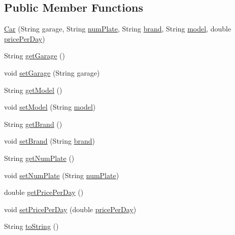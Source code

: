 \subsection*{Public Member Functions}
\begin{DoxyCompactItemize}
\item 
\mbox{\hyperlink{classcarrenting_1_1server_1_1jdo_1_1_car_ab43f746c910fab7cbc39e73aa9911384}{Car}} (String garage, String \mbox{\hyperlink{classcarrenting_1_1server_1_1jdo_1_1_car_a6d3bb3a60ca384974c0beea5a4357ebf}{num\+Plate}}, String \mbox{\hyperlink{classcarrenting_1_1server_1_1jdo_1_1_car_a346b3365c2ed154c6beb8e25e6d589fd}{brand}}, String \mbox{\hyperlink{classcarrenting_1_1server_1_1jdo_1_1_car_a75a4e7429929308edefb22ee35b9a29d}{model}}, double \mbox{\hyperlink{classcarrenting_1_1server_1_1jdo_1_1_car_aa583f558d71242bee5e30c610beb50dd}{price\+Per\+Day}})
\item 
String \mbox{\hyperlink{classcarrenting_1_1server_1_1jdo_1_1_car_a1287409c08d788e0b34f8988e7842f84}{get\+Garage}} ()
\item 
void \mbox{\hyperlink{classcarrenting_1_1server_1_1jdo_1_1_car_acb41590a03c874d15fa515aa7b95a550}{set\+Garage}} (String garage)
\item 
String \mbox{\hyperlink{classcarrenting_1_1server_1_1jdo_1_1_car_ab218a139547b4178939722b4f5756b93}{get\+Model}} ()
\item 
void \mbox{\hyperlink{classcarrenting_1_1server_1_1jdo_1_1_car_a26b0ae0658156549cae8d4e8662a0a1f}{set\+Model}} (String \mbox{\hyperlink{classcarrenting_1_1server_1_1jdo_1_1_car_a75a4e7429929308edefb22ee35b9a29d}{model}})
\item 
String \mbox{\hyperlink{classcarrenting_1_1server_1_1jdo_1_1_car_a45425648e8ef3708cc79cb6895ae8c06}{get\+Brand}} ()
\item 
void \mbox{\hyperlink{classcarrenting_1_1server_1_1jdo_1_1_car_ab5ea06fb2717d7bc7fffd8f4948fa403}{set\+Brand}} (String \mbox{\hyperlink{classcarrenting_1_1server_1_1jdo_1_1_car_a346b3365c2ed154c6beb8e25e6d589fd}{brand}})
\item 
String \mbox{\hyperlink{classcarrenting_1_1server_1_1jdo_1_1_car_a032ac9ab77bd9c980fd1bcdde95dedb4}{get\+Num\+Plate}} ()
\item 
void \mbox{\hyperlink{classcarrenting_1_1server_1_1jdo_1_1_car_ae7155dcd8b86deeead80d6213a2aa7bc}{set\+Num\+Plate}} (String \mbox{\hyperlink{classcarrenting_1_1server_1_1jdo_1_1_car_a6d3bb3a60ca384974c0beea5a4357ebf}{num\+Plate}})
\item 
double \mbox{\hyperlink{classcarrenting_1_1server_1_1jdo_1_1_car_a957fd3951d0756628a14563828bea9c7}{get\+Price\+Per\+Day}} ()
\item 
void \mbox{\hyperlink{classcarrenting_1_1server_1_1jdo_1_1_car_a9f2121fbf56b4b4d35a197d94d5dbbf8}{set\+Price\+Per\+Day}} (double \mbox{\hyperlink{classcarrenting_1_1server_1_1jdo_1_1_car_aa583f558d71242bee5e30c610beb50dd}{price\+Per\+Day}})
\item 
String \mbox{\hyperlink{classcarrenting_1_1server_1_1jdo_1_1_car_a4061c76768822dd3a20668d718a775f2}{to\+String}} ()
\end{DoxyCompactItemize}
